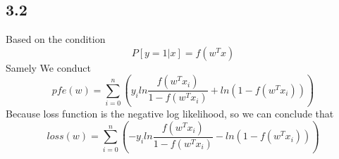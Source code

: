 \documentclass[a4paper,12pt]{article}
\begin{document}
\subsection*{3.2}
Based on the condition
$$P[y = 1 | x] = f(w^T x)$$
Samely We conduct
$$pfe(w) = \sum\limits_{i=0}^n (y_i ln\frac{f(w^T x_i)}{1 - f(w^T x_i)} + ln(1 - f(w^T x_i))) $$
Because loss function is the negative log likelihood, so we can conclude that
$$loss(w) = \sum\limits_{i=0}^n (- y_i ln\frac{f(w^T x_i)}{1 - f(w^T x_i)} - ln(1 - f(w^T x_i))) $$









\end{document}
